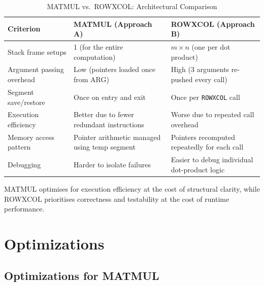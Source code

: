 \documentclass[12pt,a4paper]{article}
\begin{document}
\begin{table}[h!]
\centering
\caption{MATMUL vs.\ ROWXCOL: Architectural Comparison}

\renewcommand{\arraystretch}{1.2}

\begin{tabular}{@{}p{4cm}p{5.5cm}p{5.5cm}@{}}
\toprule

\textbf{Criterion} &
\textbf{MATMUL (Approach A)} &
\textbf{ROWXCOL (Approach B)} \\

\midrule

Stack frame setups &
1 (for the entire computation) &
$m \times n$ (one per dot product) \\

Argument passing overhead &
Low (pointers loaded once from ARG) &
High (3 arguments re-pushed every call) \\

Segment save/restore &
Once on entry and exit &
Once per \texttt{ROWXCOL} call \\

Execution efficiency &
Better due to fewer redundant instructions &
Worse due to repeated call overhead \\

Memory access pattern &
Pointer arithmetic managed using temp segment &
Pointers recomputed repeatedly for each call \\

Debugging &
Harder to isolate failures &
Easier to debug individual dot-product logic \\

\bottomrule
\end{tabular}

\end{table}

MATMUL optimises for execution efficiency at the cost of structural clarity, while ROWXCOL prioritises correctness and testability at the cost of runtime performance.

\section{Optimizations}

\subsection{Optimizations for MATMUL}
\end{document}
